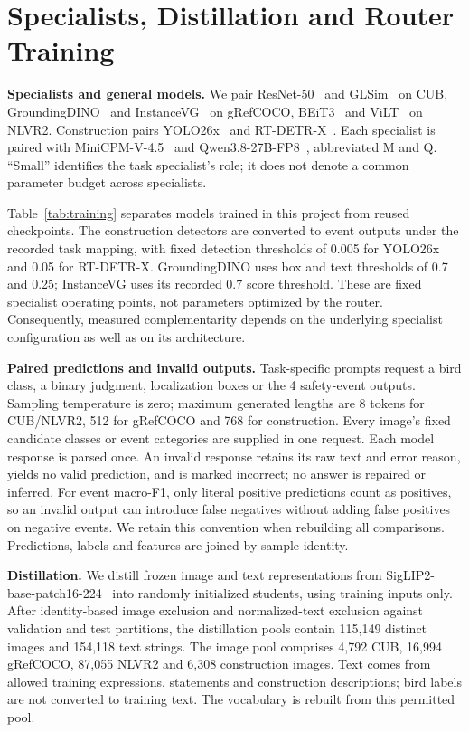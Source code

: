 \section{Specialists, Distillation and Router Training}
\label{sec:implementation}
\textbf{Specialists and general models.}
We pair ResNet-50~\cite{resnet} and GLSim~\cite{glsim} on CUB, GroundingDINO~\cite{groundingdino} and InstanceVG~\cite{instancevg} on gRefCOCO, BEiT3~\cite{beit3} and ViLT~\cite{vilt} on NLVR2. Construction pairs YOLO26x~\cite{yolo26} and RT-DETR-X~\cite{rtdetr}. Each specialist is paired with MiniCPM-V-4.5~\cite{minicpm} and Qwen3.8-27B-FP8~\cite{qwen38}, abbreviated M and Q. ``Small'' identifies the task specialist's role; it does not denote a common parameter budget across specialists.


Table~\ref{tab:training} separates models trained in this project from reused checkpoints. The construction detectors are converted to event outputs under the recorded task mapping, with fixed detection thresholds of 0.005 for YOLO26x and 0.05 for RT-DETR-X. GroundingDINO uses box and text thresholds of 0.7 and 0.25; InstanceVG uses its recorded 0.7 score threshold. These are fixed specialist operating points, not parameters optimized by the router. Consequently, measured complementarity depends on the underlying specialist configuration as well as on its architecture.

\textbf{Paired predictions and invalid outputs.}
Task-specific prompts request a bird class, a binary judgment, localization boxes or the 4 safety-event outputs. Sampling temperature is zero; maximum generated lengths are 8 tokens for CUB/NLVR2, 512 for gRefCOCO and 768 for construction. Every image's fixed candidate classes or event categories are supplied in one request. Each model response is parsed once. An invalid response retains its raw text and error reason, yields no valid prediction, and is marked incorrect; no answer is repaired or inferred. For event macro-F1, only literal positive predictions count as positives, so an invalid output can introduce false negatives without adding false positives on negative events. We retain this convention when rebuilding all comparisons. Predictions, labels and features are joined by sample identity.

\textbf{Distillation.}
We distill frozen image and text representations from SigLIP2-base-patch16-224~\cite{siglip2} into randomly initialized students, using training inputs only. After identity-based image exclusion and normalized-text exclusion against validation and test partitions, the distillation pools contain 115,149 distinct images and 154,118 text strings. The image pool comprises 4,792 CUB, 16,994 gRefCOCO, 87,055 NLVR2 and 6,308 construction images. Text comes from allowed training expressions, statements and construction descriptions; bird labels are not converted to training text. The vocabulary is rebuilt from this permitted pool.


